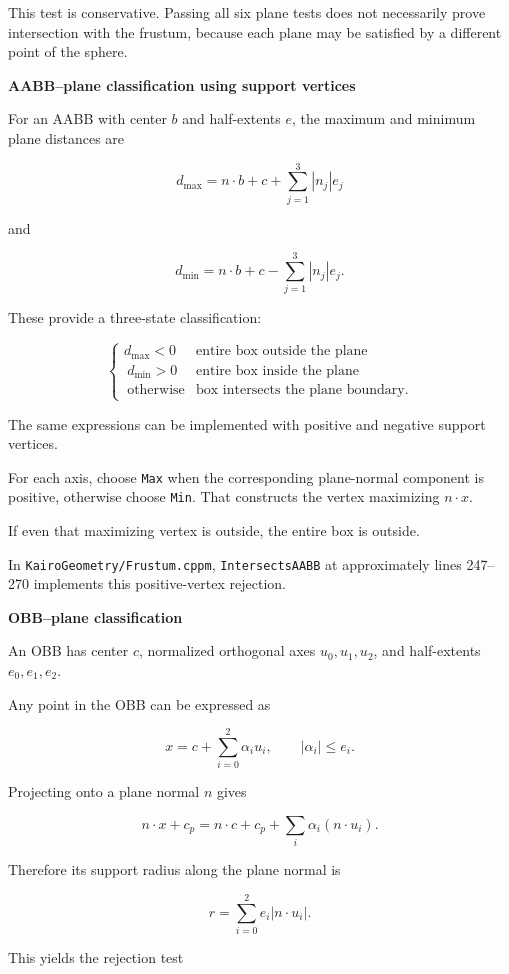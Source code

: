 This test is conservative. Passing all six plane tests does not necessarily prove intersection with the frustum, because each plane may be satisfied by a different point of the sphere.

\textbf{AABB--plane classification using support vertices}

For an AABB with center \(b\) and half-extents \(e\), the maximum and minimum plane distances are

\[
d_{\max}=n\cdot b+c+ \sum_{j=1}^3|n_j|e_j
\]

and

\[
d_{\min}=n\cdot b+c- \sum_{j=1}^3|n_j|e_j.
\]

These provide a three-state classification:

\[
\begin{cases} d_{\max}<0 & \text{entire box outside the plane}\\\ d_{\min}>0 & \text{entire box inside the plane}\\\ \text{otherwise} & \text{box intersects the plane boundary}. \end{cases}
\]

The same expressions can be implemented with positive and negative support vertices.

For each axis, choose \texttt{Max} when the corresponding plane-normal component is positive, otherwise choose \texttt{Min}. That constructs the vertex maximizing \(n\cdot x\).

If even that maximizing vertex is outside, the entire box is outside.

In \texttt{KairoGeometry/Frustum.cppm}, \texttt{IntersectsAABB} at approximately lines 247--270 implements this positive-vertex rejection.

\textbf{OBB--plane classification}

An OBB has center \(c\), normalized orthogonal axes \(u_0,u_1,u_2\), and half-extents \(e_0,e_1,e_2\).

Any point in the OBB can be expressed as

\[
x=c+\sum_{i=0}^{2}\alpha_i u_i, \qquad|\alpha_i|\le e_i.
\]

Projecting onto a plane normal \(n\) gives

\[
n\cdot x+c_p = n\cdot c+c_p+ \sum_i\alpha_i(n\cdot u_i).
\]

Therefore its support radius along the plane normal is

\[
r=\sum_{i=0}^{2}e_i|n\cdot u_i|.
\]

This yields the rejection test


